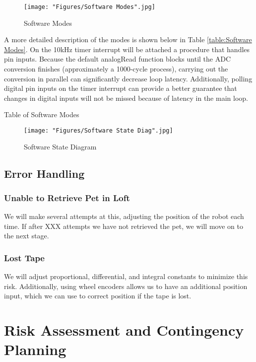 \documentclass[11pt, oneside]{article} %
\begin{document}
\begin{figure}[h]
	\centering
	\texttt{[image: "Figures/Software Modes".jpg]}
	\caption[Software Modes]{Software Modes}
	\label{fig:4}
\end{figure}

A more detailed description of the modes is shown below in Table \ref{table:Software Modes}.
On the 10kHz timer interrupt will be attached a procedure that handles pin inputs. Because the default analogRead function blocks until the ADC conversion finishes (approximately a 1000-cycle process), carrying out the conversion in parallel can significantly decrease loop latency. Additionally, polling digital pin inputs on the timer interrupt can provide a better guarantee that changes in digital inputs will not be missed because of latency in the main loop.

\begin{table}
	\caption{Table of Software Modes}
	\centering
	\label{table:Software Modes}
\end{table}

\begin{figure}[h]
	\centering
	\texttt{[image: "Figures/Software State Diag".jpg]}
	\caption[Software State Diagram]{Software State Diagram}
	\label{fig:SoftStates}
\end{figure}

	\subsection{Error Handling}
		\subsubsection{Unable to Retrieve Pet in Loft}
		We will make several attempts at this, adjusting the position of the robot each time. If after XXX attempts we have not retrieved the pet, we will move on to the next stage.
		\subsubsection{Lost Tape}
		We will adjust proportional, differential, and integral constants to minimize this risk. Additionally, using wheel encoders allows us to have an additional position input, which we can use to correct position if the tape is lost.


\section{Risk Assessment and Contingency Planning}
\end{document}
